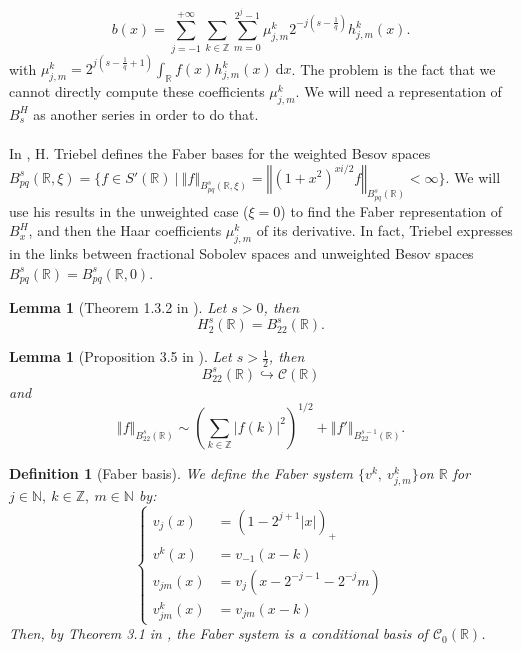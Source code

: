 \documentclass[11pt]{enstaPRE}
\newtheorem{defi}{Definition}
\newtheorem{lem}[theo]{Lemma}
\newcommand{\norme}[1]{\left\Vert #1\right\Vert}
\newcommand{\R}{\mathbb{R}}
\newcommand{\Z}{\mathbb{Z}}
\newcommand{\N}{\mathbb{N}}
\newcommand{\di}{\mathrm{d}}
\begin{document}
\begin{equation}
b(x) = \sum_{j=-1}^{+\infty}\sum_{k\in\Z}\sum_{m=0}^{2^j-1}\mu_{j,m}^k2^{-j\left(s-\frac{1}{q}\right)}h_{j,m}^k(x).
\end{equation}
with $\mu_{j,m}^k = 2^{j\left(s-\frac{1}{q}+1\right)}\int_{\R}f(x)h_{j,m}^k(x)\ \di x$. The problem is the fact that we cannot directly compute these coefficients $\mu_{j,m}^k$. We will need a representation of $B^H_s$ as another series in order to do that.

\paragraph{}
In \cite{Tri-fab}, H. Triebel defines the Faber bases for the weighted Besov spaces $B^{s}_{pq}(\R,\xi)=\{f\in S'(\R)\ |\ \norme{f}_{B^{s}_{pq}(\R,\xi)} = \norme{(1+x^2)^{xi/2}f}_{B^{s}_{pq}(\R)} < \infty\}$. We will use his results in the unweighted case ($\xi = 0$) to find the Faber representation of $B^H_x$, and then the Haar coefficients $\mu^k_{j,m}$ of its derivative. In fact, Triebel expresses in \cite{Tri-fun} the links between fractional Sobolev spaces and unweighted Besov spaces $B^{s}_{pq}(\R)=B^{s}_{pq}(\R,0)$.

\begin{lem}[Theorem 1.3.2 in \cite{Tri-fun}]
    Let $s>0$, then \begin{equation}
    H^s_2(\R)=B^s_{22}(\R).
    \end{equation}
\end{lem}

\begin{lem}[Proposition 3.5 in \cite{Tri-fab}]\label{emb}
    Let $s>\frac{1}{2}$, then 
    \begin{equation}
    B^s_{22}(\R) \hookrightarrow \mathcal{C}(\R)
    \end{equation}
    and
    \begin{equation}
    \norme{f}_{B^s_{22}(\R)} \sim \left(\sum_{k\in\Z} |f(k)|^2\right)^{1/2}+\norme{f'}_{B^{s-1}_{22}(\R)}.
    \end{equation}
\end{lem}

\begin{defi}[Faber basis]
    We define the Faber system $\{v^k,\ v^k_{j,m}\}$on $\R$ for $j\in\N,\ k\in\Z,\ m\in\N$ by:
    \begin{equation}
    \begin{cases}
    v_j(x) &= (1-2^{j+1}|x|)_+\\
    v^k(x) &= v_{-1}(x-k)\\
    v_{jm}(x) &= v_j(x-2^{-j-1}-2^{-j}m)\\
    v_{jm}^k(x) &= v_{jm}(x-k)
    \end{cases}
    \end{equation}
    Then, by Theorem 3.1 in \cite{Tri-fab}, the Faber system is a conditional basis of $\mathcal{C}_0(\R)$.
\end{defi}
\end{document}
